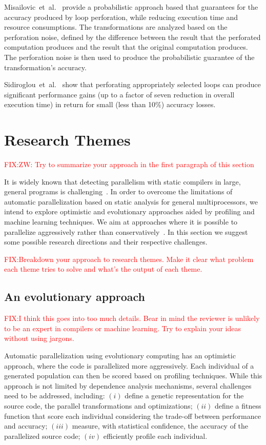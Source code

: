 \documentclass[a4paper,12pt]{article}
\newcommand{\etal}{et~al.}
\newcommand\FIXME[1]{\textcolor{red}{FIX:}\textcolor{red}{#1}}
\begin{document}
Misailovic~\etal~\cite{misailovic11} provide a probabilistic approach based
that guarantees for the accuracy produced by loop perforation, while reducing
execution time and resource consumptions.  The transformations are analyzed
based on the perforation noise, defined by the difference between the result
that the perforated computation produces and the result that the original
computation produces. The perforation noise is then used to produce the
probabilistic guarantee of the transformation's accuracy.

Sidiroglou~\etal~\cite{douskos11} show that perforating appropriately selected
loops can produce significant performance gains (up to a factor of seven
reduction in overall execution time) in return for small (less than 10\%)
accuracy losses.

\section{Research Themes}\label{sec:research-dir}

\FIXME{ZW: Try to summarize your approach in the first paragraph of this section}

It is widely known that detecting parallelism with static compilers in large,
general programs is challenging~\cite{kennedy01,chen03}.  In order to overcome
the limitations of automatic parallelization based on static analysis for
general multiprocessors, we intend to explore optimistic and evolutionary
approaches aided by profiling and machine learning techniques.  We aim at
approaches where it is possible to parallelize aggressively rather than
conservatively~\cite{chen03,williams96,williams99}. In this section we suggest
some possible research directions and their respective challenges.

\FIXME{Breakdown your approach to research themes. Make it 
clear what problem each theme tries to solve and what's the
output of each theme.}

\subsection{An evolutionary approach}
\FIXME{I think this goes into too much details. Bear in mind
the reviewer is unlikely to be an expert in compilers or machine learning.
Try to explain your ideas without using jargons. 
}

Automatic parallelization using evolutionary computing has an optimistic
approach, where the code is parallelized more aggressively.  Each individual of
a generated population can then be scored based on profiling techniques.  While
this approach is not limited by dependence analysis mechanisms, several
challenges need to be addressed, including: $(i)$ define a genetic
representation for the source code, the parallel transformations and
optimizations; $(ii)$ define a fitness function that score each individual
considering the trade-off between performance and accuracy; $(iii)$ measure,
with statistical confidence, the accuracy of the parallelized source code;
$(iv)$ efficiently profile each individual.
\end{document}
